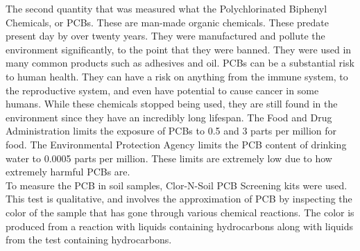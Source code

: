 \documentclass{article}
\begin{document}
    \indent The second quantity that was measured what the Polychlorinated Biphenyl Chemicals, or PCBs. These are man-made organic chemicals. These predate present day by over twenty years. They were manufactured and pollute the environment significantly, to the point that they were banned. They were used in many common products such as adhesives and oil. PCBs can be a substantial risk to human health. They can have a risk on anything from the immune system, to the reproductive system, and even have potential to cause cancer in some humans. While these chemicals stopped being used, they are still found in the environment since they have an incredibly long lifespan. The Food and Drug Administration limits the exposure of PCBs to 0.5 and 3 parts per million for food. The Environmental Protection Agency limits the PCB content of drinking water to 0.0005 parts per million. These limits are extremely low due to how extremely harmful PCBs are.\\ 
    \indent To measure the PCB in soil samples, Clor-N-Soil PCB Screening kits were used. This test is qualitative, and involves the approximation of PCB by inspecting the color of the sample that has gone through various chemical reactions. The color is produced from a reaction with liquids containing hydrocarbons along with liquids from the test containing hydrocarbons.
    \newpage
\end{document}
